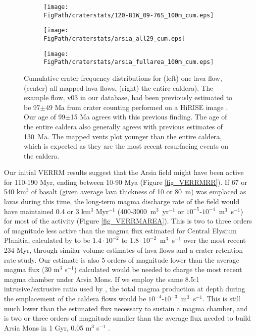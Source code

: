 \begin{figure}
\centering
\begin{subfigure}{.32\textwidth}
  \texttt{[image: \\FigPath/craterstats/120-81W\_09-76S\_100m\_cum.eps]}
\end{subfigure}
\begin{subfigure}{.32\textwidth}
  \texttt{[image: \\FigPath/craterstats/arsia\_all29\_cum.eps]}
\end{subfigure}
\begin{subfigure}{.32\textwidth}
  \texttt{[image: \\FigPath/craterstats/arsia\_fullarea\_100m\_cum.eps]}
\end{subfigure}
\caption[Cumulative crater frequency distributions.]{Cumulative crater frequency distributions for (left) one lava flow, (center) all mapped lava flows, (right) the entire caldera). The example flow, v03 in our database, had been previously estimated to be 97$\pm$49 Ma from crater counting performed on a HiRISE image \citep{robbins2011volcanic}. Our age of 99$\pm$15 Ma agrees with this previous finding. The age of the entire caldera also generally agrees with previous estimates of 130~Ma. The mapped vents plot younger than the entire caldera, which is expected as they are the most recent resurfacing events on the caldera.}
\label{fig_craterct}
\end{figure}

Our initial VERRM results suggest that the Arsia field might have been active for 110-190 Myr, ending between 10-90 Mya (Figure \ref{fig_VERRMRR}). If 67 or 540 km$^3$ of basalt (given average lava thickness of 10 or 80~m) was emplaced as lavas during this time, the long-term magma discharge rate of the field would have maintained 0.4 or 3 km$^3$ Myr$^{-1}$ (400-3000~m$^3$~yr$^{-1}$ or $10^{-5}$-$10^{-4}$~m$^3$~s$^{-1}$) for most of the activity (Figure \ref{fig_VERRMAREA}). This is two to three orders of magnitude less active than the magma flux estimated for Central Elysium Planitia, calculated by \citet{vaucher2009volcanic} to be $1.4\cdot 10^{-2}$ to $1.8\cdot 10^{-2}$~m$^3$~s$^{-1}$ over the most recent 234 Myr, through similar volume estimates of lava flows and a crater retention rate study. Our estimate is also 5 orders of magnitude lower than the average magma flux (30 m$^3$ s$^{-1}$) \citet{wilson2001evidence} calculated would be needed to charge the most recent magma chamber under Arsia Mons. If we employ the same 8.5:1 intrusive/extrusive ratio used by \citet{greeley1991magma}, the total magma production at depth during the emplacement of the caldera flows would be $10^{-4}$-$10^{-3}$~m$^3$~s$^{-1}$. This is still much lower than the estimated flux necessary to sustain a magma chamber, and is two or three orders of magnitude smaller than the average flux needed to build Arsia Mons in 1 Gyr, 0.05 m$^3$ s$^{-1}$ \citep{wilson2001evidence}.

